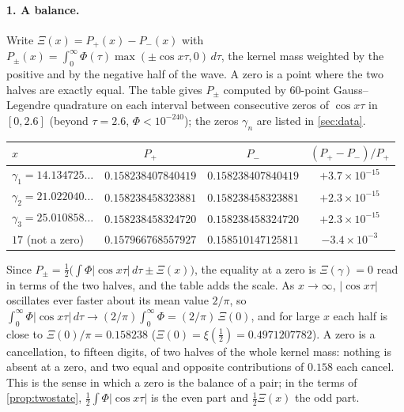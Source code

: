 \documentclass[11pt]{article}
\theoremstyle{definition}\newtheorem{definition}[theorem]{Definition}
\theoremstyle{remark}\newtheorem{remark}[theorem]{Remark}
\begin{document}
\paragraph{1. A balance.} Write $\Xi(x)=P_+(x)-P_-(x)$ with $P_\pm(x)=\int_0^\infty\Phi(\tau)\max(\pm\cos x\tau,0)\,d\tau$, the kernel mass weighted by the positive and by the negative half of the wave. A zero is a point where the two halves are exactly equal. The table gives $P_\pm$ computed by 60-point Gauss--Legendre quadrature on each interval between consecutive zeros of $\cos x\tau$ in $[0,2.6]$ (beyond $\tau=2.6$, $\Phi<10^{-240}$); the zeros $\gamma_n$ are listed in \cref{sec:data}.
\begin{center}\small
\begin{tabular}{@{}lccc@{}}\toprule
$x$ & $P_+$ & $P_-$ & $(P_+-P_-)/P_+$\\\midrule
$\gamma_1=14.134725\ldots$ & $0.158238407840419$ & $0.158238407840419$ & $+3.7\times10^{-15}$\\
$\gamma_2=21.022040\ldots$ & $0.158238458323881$ & $0.158238458323881$ & $+2.3\times10^{-15}$\\
$\gamma_3=25.010858\ldots$ & $0.158238458324720$ & $0.158238458324720$ & $+2.3\times10^{-15}$\\
$17$ (not a zero) & $0.157966768557927$ & $0.158510147125811$ & $-3.4\times10^{-3}$\\\bottomrule
\end{tabular}
\end{center}
Since $P_\pm=\frac12\bigl(\int\Phi|\cos x\tau|\,d\tau\pm\Xi(x)\bigr)$, the equality at a zero is $\Xi(\gamma)=0$ read in terms of the two halves, and the table adds the scale. As $x\to\infty$, $|\cos x\tau|$ oscillates ever faster about its mean value $2/\pi$, so $\int_0^\infty\Phi|\cos x\tau|\,d\tau\to(2/\pi)\int_0^\infty\Phi=(2/\pi)\,\Xi(0)$, and for large $x$ each half is close to $\Xi(0)/\pi=0.158238$ ($\Xi(0)=\xi(\frac12)=0.4971207782$). A zero is a cancellation, to fifteen digits, of two halves of the whole kernel mass: nothing is absent at a zero, and two equal and opposite contributions of $0.158$ each cancel. This is the sense in which a zero is the balance of a pair; in the terms of \cref{prop:twostate}, $\frac12\int\Phi|\cos x\tau|$ is the even part and $\frac12\Xi(x)$ the odd part.
\end{document}
